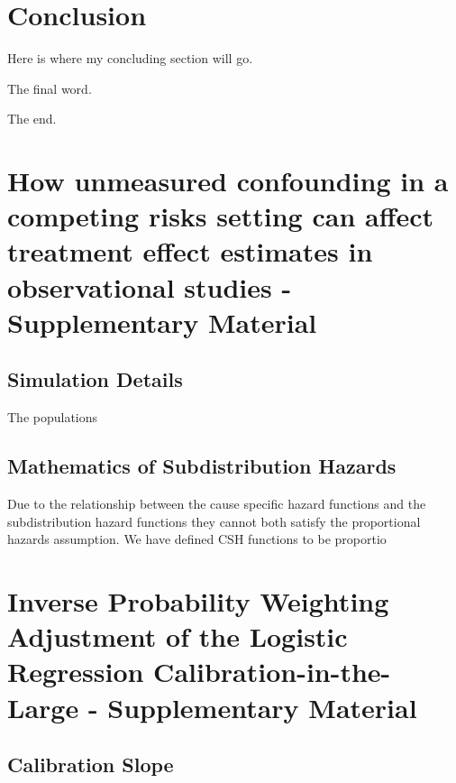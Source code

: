\documentclass[12pt,PhD,twoside,openright]{muthesis}
\begin{document}
\hypertarget{chap-conclusion}{%
\chapter{Conclusion}\label{chap-conclusion}}

Here is where my concluding section will go.

The final word.

The end.

\hypertarget{appendix-appendices}{%
\appendix}


\hypertarget{chap-Conf-CR-supp}{%
\chapter{How unmeasured confounding in a competing risks setting can affect treatment effect estimates in observational studies - Supplementary Material}\label{chap-Conf-CR-supp}}

\hypertarget{simulation-details}{%
\section{Simulation Details}\label{simulation-details}}

The populations

\hypertarget{mathematics-of-subdistribution-hazards}{%
\section{Mathematics of Subdistribution Hazards}\label{mathematics-of-subdistribution-hazards}}

Due to the relationship between the cause specific hazard functions and the subdistribution hazard functions they cannot both satisfy the proportional hazards assumption. We have defined CSH functions to be proportio

\hypertarget{chap-IPCW-logistic-supp}{%
\chapter{Inverse Probability Weighting Adjustment of the Logistic Regression Calibration-in-the-Large - Supplementary Material}\label{chap-IPCW-logistic-supp}}

\hypertarget{calibration-slope}{%
\section{Calibration Slope}\label{calibration-slope}}
\end{document}
